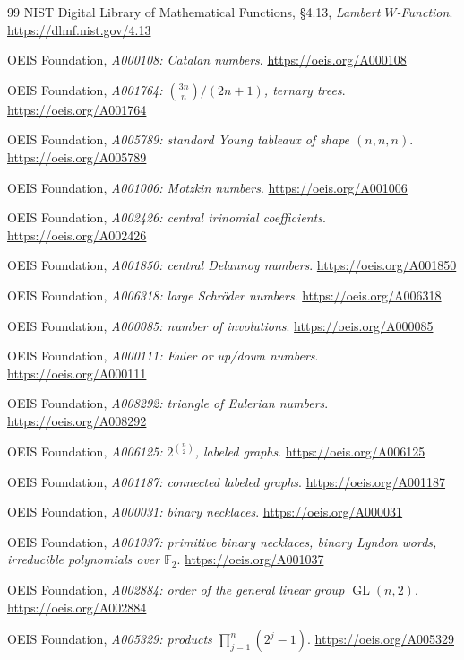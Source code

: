 \documentclass[11pt,openany]{book}
\numberwithin{equation}{chapter}
\theoremstyle{plain}
\theoremstyle{definition}
\theoremstyle{remark}
\newcommand{\F}{\mathbb F}
\newcommand{\GL}{\operatorname{GL}}\newcommand{\Sp}{\operatorname{Sp}}
\begin{document}
\begin{thebibliography}{99}
NIST Digital Library of Mathematical Functions, \S4.13, \emph{Lambert $W$-Function}. \url{https://dlmf.nist.gov/4.13}

OEIS Foundation, \emph{A000108: Catalan numbers}. \url{https://oeis.org/A000108}

OEIS Foundation, \emph{A001764: $\binom{3n}{n}/(2n+1)$, ternary trees}. \url{https://oeis.org/A001764}

OEIS Foundation, \emph{A005789: standard Young tableaux of shape $(n,n,n)$}. \url{https://oeis.org/A005789}

OEIS Foundation, \emph{A001006: Motzkin numbers}. \url{https://oeis.org/A001006}

OEIS Foundation, \emph{A002426: central trinomial coefficients}. \url{https://oeis.org/A002426}

OEIS Foundation, \emph{A001850: central Delannoy numbers}. \url{https://oeis.org/A001850}

OEIS Foundation, \emph{A006318: large Schr\"oder numbers}. \url{https://oeis.org/A006318}

OEIS Foundation, \emph{A000085: number of involutions}. \url{https://oeis.org/A000085}

OEIS Foundation, \emph{A000111: Euler or up/down numbers}. \url{https://oeis.org/A000111}

OEIS Foundation, \emph{A008292: triangle of Eulerian numbers}. \url{https://oeis.org/A008292}

OEIS Foundation, \emph{A006125: $2^{\binom n2}$, labeled graphs}. \url{https://oeis.org/A006125}

OEIS Foundation, \emph{A001187: connected labeled graphs}. \url{https://oeis.org/A001187}

OEIS Foundation, \emph{A000031: binary necklaces}. \url{https://oeis.org/A000031}

OEIS Foundation, \emph{A001037: primitive binary necklaces, binary Lyndon words, irreducible polynomials over $\F_2$}. \url{https://oeis.org/A001037}

OEIS Foundation, \emph{A002884: order of the general linear group $\GL(n,2)$}. \url{https://oeis.org/A002884}

OEIS Foundation, \emph{A005329: products $\prod_{j=1}^n(2^j-1)$}. \url{https://oeis.org/A005329}


\end{thebibliography}
\end{document}
